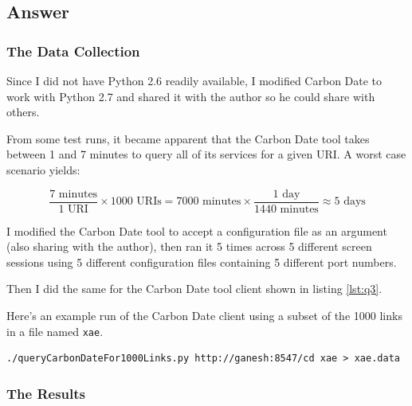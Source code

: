 \documentclass[letterpaper,11pt]{article}
\begin{document}
\newpage
\subsection*{Answer}

\subsubsection*{The Data Collection}
Since I did not have Python 2.6 readily available, I modified Carbon Date to work with Python 2.7 and shared it with the author so he could share with others.

From some test runs, it became apparent that the Carbon Date tool takes between 1 and 7 minutes to query all of its services for a given URI.  A worst case scenario yields:

\[
\frac{7 \textrm{ minutes}}{1 \textrm{ URI}} \times {1000 \textrm{ URIs}} = {7000 \textrm{ minutes}} \times \frac{1 \textrm{ day}}{1440 \textrm{ minutes}} \approx {5 \textrm{ days}}
\]

I modified the Carbon Date tool to accept a configuration file as an argument (also sharing with the author), then ran it 5 times across 5 different screen sessions using 5 different configuration files containing 5 different port numbers.

Then I did the same for the Carbon Date tool client shown in listing \ref{lst:q3}.

Here's an example run of the Carbon Date client using a subset of the 1000 links in a file named \verb+xae+.
\begin{lstlisting}[frame=single]
./queryCarbonDateFor1000Links.py http://ganesh:8547/cd xae > xae.data
\end{lstlisting}

\subsubsection*{The Results}
\end{document}
